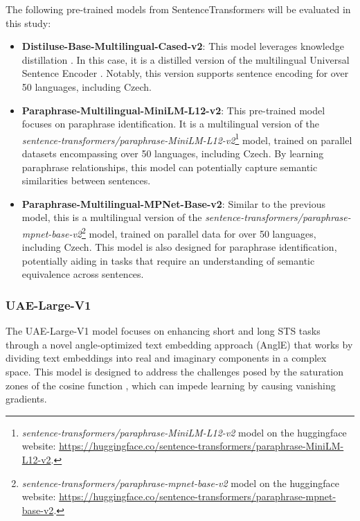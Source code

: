 The following pre-trained models from SentenceTransformers will be evaluated in this study:
\begin{itemize}
  \item \textbf{Distiluse-Base-Multilingual-Cased-v2}:
 This model leverages knowledge distillation \cite{sanh2020distilbert}.
 In this case, it is a distilled version of the multilingual Universal Sentence Encoder \cite{yang2019multilingual}.
 Notably, this version supports sentence encoding for over 50 languages, including Czech.
  \item \textbf{Paraphrase-Multilingual-MiniLM-L12-v2}: This pre-trained model focuses on paraphrase identification.
 It is a multilingual version of the \textit{sentence-transformers/paraphrase-MiniLM-L12-v2}\footnote{\textit{sentence-transformers/paraphrase-MiniLM-L12-v2} model on the huggingface website: \url{https://huggingface.co/sentence-transformers/paraphrase-MiniLM-L12-v2}.} model, trained on parallel datasets encompassing over 50 languages, including Czech.
 By learning paraphrase relationships, this model can potentially capture semantic similarities between sentences.
  \item \textbf{Paraphrase-Multilingual-MPNet-Base-v2}: Similar to the previous model, this is a multilingual version of the \textit{sentence-transformers/paraphrase-mpnet-base-v2}\footnote{\textit{sentence-transformers/paraphrase-mpnet-base-v2} model on the huggingface website: \url{https://huggingface.co/sentence-transformers/paraphrase-mpnet-base-v2}.} model, trained on parallel data for over 50 languages, including Czech.
 This model is also designed for paraphrase identification, potentially aiding in tasks that require an understanding of semantic equivalence across sentences.
\end{itemize}



\subsubsection{UAE-Large-V1} \label{model-uae-large-v1}
The UAE-Large-V1 model \cite{li2024angleoptimized} focuses on enhancing short and long \ac{STS} tasks through a novel angle-optimized text embedding approach (AnglE) \cite{li2024angleoptimized} that works by dividing text embeddings into real and imaginary components in a complex space.
This model is designed to address the challenges posed by the saturation zones of the cosine function , which can impede learning by causing vanishing gradients.

